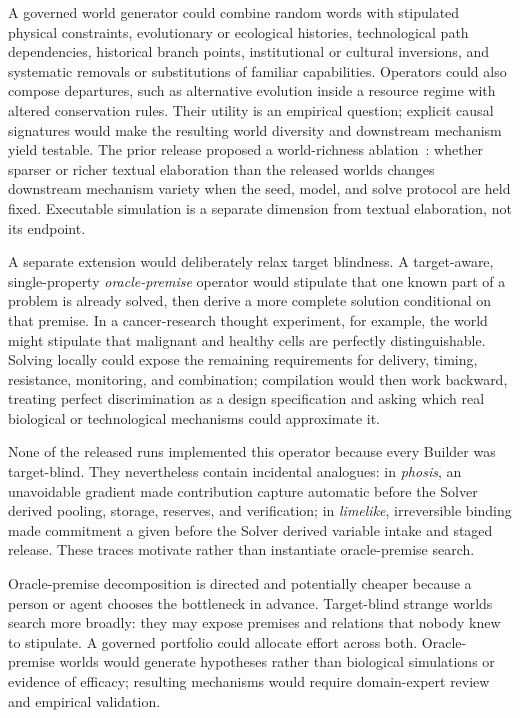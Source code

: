 \documentclass[11pt,a4paper]{article}
\begin{document}
A governed world generator could combine random words with stipulated physical constraints, evolutionary or ecological histories, technological path dependencies, historical branch points, institutional or cultural inversions, and systematic removals or substitutions of familiar capabilities. Operators could also compose departures, such as alternative evolution inside a resource regime with altered conservation rules. Their utility is an empirical question; explicit causal signatures would make the resulting world diversity and downstream mechanism yield testable. The prior release proposed a world-richness ablation~\cite{westerberg2025strangeworlds}: whether sparser or richer textual elaboration than the released worlds changes downstream mechanism variety when the seed, model, and solve protocol are held fixed. Executable simulation is a separate dimension from textual elaboration, not its endpoint.

A separate extension would deliberately relax target blindness. A target-aware, single-property \emph{oracle-premise} operator would stipulate that one known part of a problem is already solved, then derive a more complete solution conditional on that premise. In a cancer-research thought experiment, for example, the world might stipulate that malignant and healthy cells are perfectly distinguishable. Solving locally could expose the remaining requirements for delivery, timing, resistance, monitoring, and combination; compilation would then work backward, treating perfect discrimination as a design specification and asking which real biological or technological mechanisms could approximate it.

None of the released runs implemented this operator because every Builder was target-blind. They nevertheless contain incidental analogues: in \emph{phosis}, an unavoidable gradient made contribution capture automatic before the Solver derived pooling, storage, reserves, and verification; in \emph{limelike}, irreversible binding made commitment a given before the Solver derived variable intake and staged release. These traces motivate rather than instantiate oracle-premise search.

Oracle-premise decomposition is directed and potentially cheaper because a person or agent chooses the bottleneck in advance. Target-blind strange worlds search more broadly: they may expose premises and relations that nobody knew to stipulate. A governed portfolio could allocate effort across both. Oracle-premise worlds would generate hypotheses rather than biological simulations or evidence of efficacy; resulting mechanisms would require domain-expert review and empirical validation.
\end{document}
